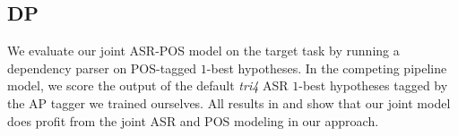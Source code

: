 \documentclass[11pt,letterpaper]{article}
\begin{document}
\subsection{DP}
We evaluate our joint ASR-POS model on the target task by running a dependency parser on POS-tagged $1$-best hypotheses. In the competing pipeline model, we score the output of the default \emph{tri4} ASR $1$-best hypotheses tagged by the AP tagger we trained ourselves. All results in  and  show that our joint model does profit from the joint ASR and POS modeling in our approach.
\begin{table}[h]
    \centering
    \caption[Parsing results for subsets of correct tokenizations.]{Parsing results for subsets of correct tokenizations. Labeled attachment scores (LAS) and unlabeled attachment scores (UAS) given as percentages. Best scores on the common sets in boldface.}
    \label{tab:parres}
\end{table}
\end{document}
